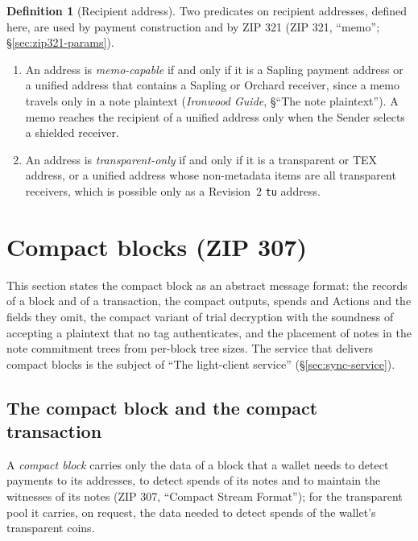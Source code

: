 \documentclass[11pt,a4paper]{article}
\theoremstyle{definition}
\newtheorem{definition}[theorem]{Definition}
\begin{document}
\begin{definition}[Recipient address]
Two predicates on recipient addresses, defined here, are used by payment
construction and by ZIP 321 (ZIP 321, ``memo''; \S\ref{sec:zip321-params}).
\begin{enumerate}[label=(\roman*)]
\item An address is \emph{memo-capable} if and only if it is a Sapling
  payment address or a unified address that contains a Sapling or Orchard
  receiver, since a memo travels only in a note plaintext (\emph{Ironwood
  Guide}, \S``The note plaintext''). A memo reaches the recipient of a
  unified address only when the Sender selects a shielded receiver.
\item An address is \emph{transparent-only} if and only if it is a
  transparent or TEX address, or a unified address whose non-metadata items
  are all transparent receivers, which is possible only as a Revision~$2$
  \texttt{tu} address.
\end{enumerate}
\end{definition}

\section{Compact blocks (ZIP 307)}\label{sec:sync-compact}

This section states the compact block as an abstract message format: the
records of a block and of a transaction, the compact outputs, spends and
Actions and the fields they omit, the compact variant of trial decryption
with the soundness of accepting a plaintext that no tag authenticates, and
the placement of notes in the note commitment trees from per-block tree
sizes. The service that delivers compact blocks is the subject of ``The
light-client service'' (\S\ref{sec:sync-service}).

\subsection{The compact block and the compact transaction}%
\label{sec:compact-format}

A \emph{compact block} carries only the data of a block that a wallet needs
to detect payments to its addresses, to detect spends of its notes and to
maintain the witnesses of its notes (ZIP 307, ``Compact Stream Format''); for
the transparent pool it carries, on request, the data needed to detect
spends of the wallet's transparent coins.
\end{document}
